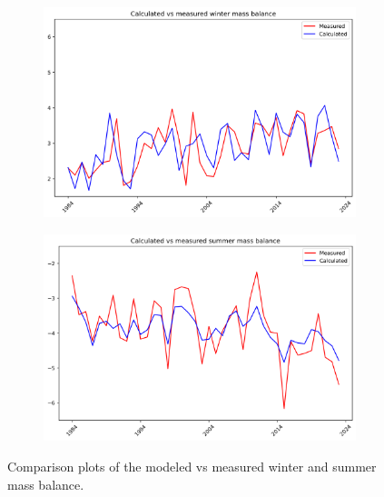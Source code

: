 \documentclass{article}
\begin{document}
\begin{figure}[h!]
    \centering
    \begin{subfigure}[b]{0.49\textwidth}
        \centering
        \includegraphics[width=\textwidth]{Plots/winter_mb_compare.png}
        \label{fig:winter_mb_compare}
    \end{subfigure}
    \hfill
    \begin{subfigure}[b]{0.49\textwidth}
        \centering
        \includegraphics[width=\textwidth]{Plots/summer_mb_compare.png}
        \label{fig:summer_mb_compare}
    \end{subfigure}
    \caption{Comparison plots of the modeled vs measured winter and summer mass balance.}
    \label{fig:mb_comparison}
\end{figure}
\FloatBarrier
\end{document}

